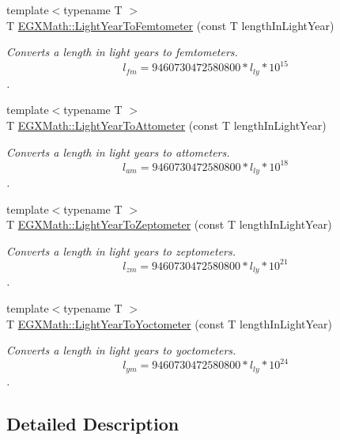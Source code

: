 \begin{DoxyCompactItemize}
{\footnotesize template$<$typename T $>$ }\\T \mbox{\hyperlink{group___e_g_x_math-_conversions-_length_conversions-_astronomical-_light_year-_s_i_ga5b812ad19216d3cf0e9da61009445cbf}{E\+G\+X\+Math\+::\+Light\+Year\+To\+Femtometer}} (const T length\+In\+Light\+Year)
\begin{DoxyCompactList}\small\item\em Converts a length in light years to femtometers. \[ l_{fm}=9460730472580800 * l_{ly} * 10^{15} \]. \end{DoxyCompactList}\item 
{\footnotesize template$<$typename T $>$ }\\T \mbox{\hyperlink{group___e_g_x_math-_conversions-_length_conversions-_astronomical-_light_year-_s_i_ga3610878361df6a45432eb294c527cdfa}{E\+G\+X\+Math\+::\+Light\+Year\+To\+Attometer}} (const T length\+In\+Light\+Year)
\begin{DoxyCompactList}\small\item\em Converts a length in light years to attometers. \[ l_{am}=9460730472580800 * l_{ly} * 10^{18} \]. \end{DoxyCompactList}\item 
{\footnotesize template$<$typename T $>$ }\\T \mbox{\hyperlink{group___e_g_x_math-_conversions-_length_conversions-_astronomical-_light_year-_s_i_ga9edab3e87135a70649bc16d6118f5614}{E\+G\+X\+Math\+::\+Light\+Year\+To\+Zeptometer}} (const T length\+In\+Light\+Year)
\begin{DoxyCompactList}\small\item\em Converts a length in light years to zeptometers. \[ l_{zm}=9460730472580800 * l_{ly} * 10^{21} \]. \end{DoxyCompactList}\item 
{\footnotesize template$<$typename T $>$ }\\T \mbox{\hyperlink{group___e_g_x_math-_conversions-_length_conversions-_astronomical-_light_year-_s_i_ga2e306829867215c96b04e558db7d15b9}{E\+G\+X\+Math\+::\+Light\+Year\+To\+Yoctometer}} (const T length\+In\+Light\+Year)
\begin{DoxyCompactList}\small\item\em Converts a length in light years to yoctometers. \[ l_{ym}=9460730472580800 * l_{ly} * 10^{24} \]. \end{DoxyCompactList}\end{DoxyCompactItemize}


\subsection{Detailed Description}


